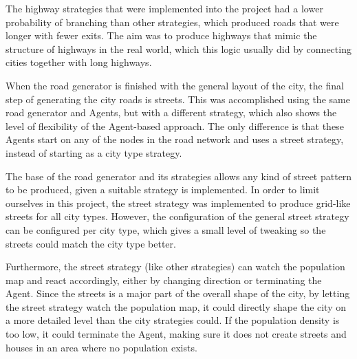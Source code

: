 The highway strategies that were implemented into the project had a lower probability of branching than other strategies, which produced roads that were longer with fewer exits.
The aim was to produce highways that mimic the structure of highways in the real world, which this logic usually did by connecting cities together with long highways.

When the road generator is finished with the general layout of the city, the final step of generating the city roads is streets.
This was accomplished using the same road generator and Agents, but with a different strategy, which also shows the level of flexibility of the Agent-based approach.
The only difference is that these Agents start on any of the nodes in the road network and uses a street strategy, instead of starting as a city type strategy.

The base of the road generator and its strategies allows any kind of street pattern to be produced, given a suitable strategy is implemented.
In order to limit ourselves in this project, the street strategy was implemented to produce grid-like streets for all city types.
However, the configuration of the general street strategy can be configured per city type, which gives a small level of tweaking so the streets could match the city type better.

Furthermore, the street strategy (like other strategies) can watch the population map and react accordingly, either by changing direction or terminating the Agent.
Since the streets is a major part of the overall shape of the city, by letting the street strategy watch the population map, it could directly shape the city on a more detailed level than the city strategies could.
If the population density is too low, it could terminate the Agent, making sure it does not create streets and houses in an area where no population exists.
